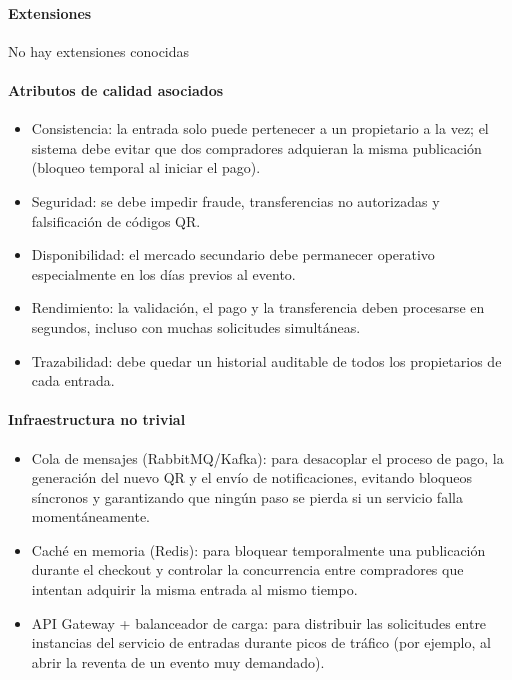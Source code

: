 \paragraph{Extensiones}
No hay extensiones conocidas

\paragraph{Atributos de calidad asociados}
\begin{itemize}[leftmargin=1.4em, topsep=1pt]
  \item Consistencia: la entrada solo puede pertenecer a un propietario a la vez; el sistema debe evitar que dos compradores adquieran la misma publicación (bloqueo temporal al iniciar el pago).
  \item Seguridad: se debe impedir fraude, transferencias no autorizadas y falsificación de códigos QR.
  \item Disponibilidad: el mercado secundario debe permanecer operativo especialmente en los días previos al evento.
  \item Rendimiento: la validación, el pago y la transferencia deben procesarse en segundos, incluso con muchas solicitudes simultáneas.
  \item Trazabilidad: debe quedar un historial auditable de todos los propietarios de cada entrada.
\end{itemize}

\paragraph{Infraestructura no trivial}
\begin{itemize}[leftmargin=1.4em, topsep=1pt]
  \item Cola de mensajes (RabbitMQ/Kafka): para desacoplar el proceso de pago, la generación del nuevo QR y el envío de notificaciones, evitando bloqueos síncronos y garantizando que ningún paso se pierda si un servicio falla momentáneamente.
  \item Caché en memoria (Redis): para bloquear temporalmente una publicación durante el checkout y controlar la concurrencia entre compradores que intentan adquirir la misma entrada al mismo tiempo.
  \item API Gateway + balanceador de carga: para distribuir las solicitudes entre instancias del servicio de entradas durante picos de tráfico (por ejemplo, al abrir la reventa de un evento muy demandado).
\end{itemize}

